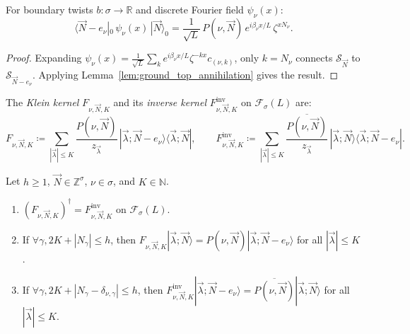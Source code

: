 \begin{proposition}
\label{prop:ground_field_coeff}
For boundary twists $b : \sigma \to \mathbb{R}$ and discrete Fourier field $\psi_\nu(x)$:
\begin{equation}
\langle \vec{N} - e_\nu |_0\, \psi_\nu(x)\, |\vec{N}\rangle_0 = \frac{1}{\sqrt{L}}\, P(\nu, \vec{N})\, e^{i \beta_\nu x / L}\, \zeta^{x N_\nu}.
\end{equation}
\end{proposition}

\begin{proof}
Expanding $\psi_\nu(x) = \frac{1}{\sqrt{L}} \sum_k e^{i \beta_\nu x / L} \zeta^{-k x} c_{(\nu, k)}$, only $k = N_\nu$ connects $\mathcal{S}_{\vec{N}}$ to $\mathcal{S}_{\vec{N}-e_\nu}$. Applying Lemma~\ref{lem:ground_top_annihilation} gives the result.
\end{proof}

\begin{definition}
\label{def:klein_kernel}
The \emph{Klein kernel} $F_{\nu, \vec{N}, K}$ and its \emph{inverse kernel} $F_{\nu, \vec{N}, K}^{\mathrm{inv}}$ on $\mathcal{F}_\sigma(L)$ are:
\begin{equation}
\label{eq:klein_kernel_def}
F_{\nu, \vec{N}, K} \coloneqq \sum_{|\vec{\lambda}| \le K} \frac{P(\nu, \vec{N})}{z_{\vec{\lambda}}}\, |\vec{\lambda}; \vec{N} - e_\nu\rangle \langle \vec{\lambda}; \vec{N}|, \qquad
F_{\nu, \vec{N}, K}^{\mathrm{inv}} \coloneqq \sum_{|\vec{\lambda}| \le K} \frac{\overline{P(\nu, \vec{N})}}{z_{\vec{\lambda}}}\, |\vec{\lambda}; \vec{N}\rangle \langle \vec{\lambda}; \vec{N} - e_\nu|.
\end{equation}
\end{definition}

\begin{lemma}
\label{lem:kernel_properties}
Let $h \ge 1$, $\vec{N} \in \mathbb{Z}^\sigma$, $\nu \in \sigma$, and $K \in \mathbb{N}$.
\begin{enumerate}
    \item $(F_{\nu, \vec{N}, K})^\dagger = F_{\nu, \vec{N}, K}^{\mathrm{inv}}$ on $\mathcal{F}_\sigma(L)$.
    \item If $\forall \gamma, 2K + |N_\gamma| \le h$, then $F_{\nu, \vec{N}, K} |\vec{\lambda}; \vec{N}\rangle = P(\nu, \vec{N}) |\vec{\lambda}; \vec{N} - e_\nu\rangle$ for all $|\vec{\lambda}| \le K$.
    \item If $\forall \gamma, 2K + |N_\gamma - \delta_{\nu, \gamma}| \le h$, then $F_{\nu, \vec{N}, K}^{\mathrm{inv}} |\vec{\lambda}; \vec{N} - e_\nu\rangle = \overline{P(\nu, \vec{N})} |\vec{\lambda}; \vec{N}\rangle$ for all $|\vec{\lambda}| \le K$.
\end{enumerate}
\end{lemma}

